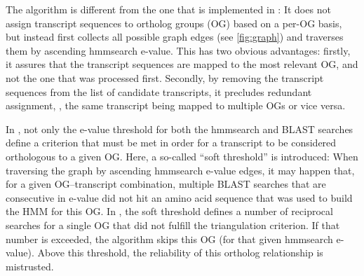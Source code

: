 The \pname algorithm is different from the one that is implemented in \hamstr:
It does not assign transcript sequences to ortholog groups (OG) based on a
per-OG basis, but instead first collects all possible graph edges (see
\autoref{fig:graph}) and traverses them by ascending hmmsearch e-value. This has
two obvious advantages: firstly, it assures that the transcript sequences are
mapped to the most relevant OG, and not the one that was processed first.
Secondly, by removing the transcript sequences from the list of candidate
transcripts, it precludes redundant assignment, \ie, the same transcript being
mapped to multiple OGs or vice versa.

In \pname, not only the e-value threshold for both the hmmsearch and BLAST
searches define a criterion that must be met in order for a transcript to be
considered orthologous to a given OG. Here, a so-called ``soft threshold'' is
introduced: When traversing the graph by ascending hmmsearch e-value edges, it
may happen that, for a given OG--transcript combination, multiple BLAST searches
that are consecutive in e-value did not hit an amino acid sequence that was used
to build the HMM for this OG. In \pname, the soft threshold defines a number of
reciprocal searches for a single OG that did not fulfill the triangulation
criterion. If that number is exceeded, the algorithm skips this OG (for that
given hmmsearch e-value). Above this threshold, the reliability of this ortholog
relationship is mistrusted.
